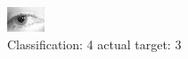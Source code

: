 \begin{figure}[h!]
\begin{center}
\includegraphics[width=0.60\columnwidth]{figures/ID1350_class_4_target_3.png}
\end{center}
\caption{ Classification: 4 actual target: 3}
\label{fig:ID1350_class_4_target_3}
\end{figure}
